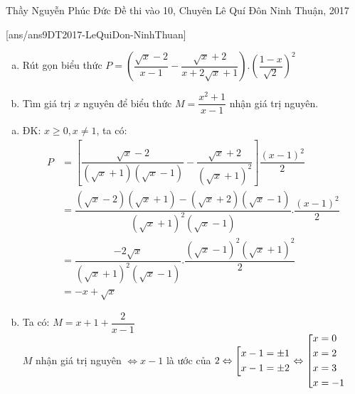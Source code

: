 \begin{name}
{Thầy  Nguyễn Phúc Đức}
{Đề thi vào 10, Chuyên Lê Quí Đôn Ninh Thuận, 2017}
\end{name}
\setcounter{ex}{0}
[ans/ans9DT2017-LeQuiDon-NinhThuan]
	\begin{ex}%
		\hspace{.01mm}
		\begin{enumerate}[a)] 			
			\item Rút gọn biểu thức $ P=\left(\dfrac{\sqrt{x}-2}{x-1}-\dfrac{\sqrt{x}+2}{x+2\sqrt{x}+1}\right).{{\left(\dfrac{1-x}{\sqrt{2}}\right)}^{2}}$				
	\item Tìm giá trị  $x$  nguyên để biểu thức $ M=\dfrac{x^2+1}{x-1}$ nhận giá trị nguyên.
		\end{enumerate}	
	\loigiai
	{
		\begin{enumerate}[a)]
		\item 	ĐK: $x\ge 0, x\neq 1$, ta có: 
		\begin{align*}
		P&=\left[\dfrac{\sqrt{x}-2}{(\sqrt{x}+1)(\sqrt{x}-1)}-\dfrac{\sqrt{x}+2}{(\sqrt{x}+1)^2}\right]\dfrac{(x-1)^2}{2}\\
		&=\dfrac{(\sqrt{x}-2)(\sqrt{x}+1)-(\sqrt{x}+2)(\sqrt{x}-1)}{(\sqrt{x}+1)^2(\sqrt{x}-1)}.\dfrac{(x-1)^2}{2}\\
		&=\dfrac{-2\sqrt{x}}{{(\sqrt{x}+1)}^2(\sqrt{x}-1)}. \dfrac{{(\sqrt{x}-1)}^2{(\sqrt{x}+1)}^2}{2}\\
		&=-x+\sqrt{x}
		\end{align*}
		\item Ta có: $M=x+1+\dfrac{2}{x-1}$\\
		$M$  nhận giá trị nguyên $\Leftrightarrow x-1$ là ước của $2\Leftrightarrow \left[\begin{aligned}& x-1=\pm 1 \\ 
& x-1=\pm 2 
\end{aligned}\right.\Leftrightarrow \left[\begin{aligned}& x=0 \\ 
& x=2 \\ 
& x=3 \\ 
& x=-1
\end{aligned}\right.$ 
 		\end{enumerate}
		}	
	\end{ex}
	
